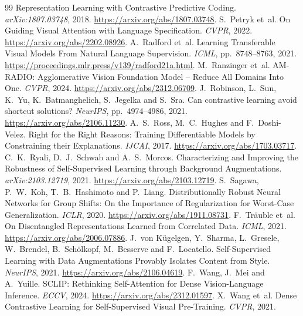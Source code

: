 \documentclass{article}
\begin{document}
\begin{thebibliography}{99}
Representation Learning with Contrastive Predictive Coding. \emph{arXiv:1807.03748}, 2018.
\url{https://arxiv.org/abs/1807.03748}.
S.~Petryk et~al.
On Guiding Visual Attention with Language Specification. \emph{CVPR}, 2022.
\url{https://arxiv.org/abs/2202.08926}.
A.~Radford et~al.
Learning Transferable Visual Models From Natural Language Supervision.
\emph{ICML}, pp.~8748--8763, 2021.
\url{https://proceedings.mlr.press/v139/radford21a.html}.
M.~Ranzinger et~al.
AM-RADIO: Agglomerative Vision Foundation Model -- Reduce All Domains Into One.
\emph{CVPR}, 2024. \url{https://arxiv.org/abs/2312.06709}.
J.~Robinson, L.~Sun, K.~Yu, K.~Batmanghelich, S.~Jegelka and S.~Sra.
Can contrastive learning avoid shortcut solutions? \emph{NeurIPS}, pp.~4974--4986, 2021.
\url{https://arxiv.org/abs/2106.11230}.
A.~S.~Ross, M.~C.~Hughes and F.~Doshi-Velez.
Right for the Right Reasons: Training Differentiable Models by Constraining their Explanations.
\emph{IJCAI}, 2017. \url{https://arxiv.org/abs/1703.03717}.
C.~K.~Ryali, D.~J.~Schwab and A.~S.~Morcos.
Characterizing and Improving the Robustness of Self-Supervised Learning through Background Augmentations.
\emph{arXiv:2103.12719}, 2021. \url{https://arxiv.org/abs/2103.12719}.
S.~Sagawa, P.~W.~Koh, T.~B.~Hashimoto and P.~Liang.
Distributionally Robust Neural Networks for Group Shifts: On the Importance
of Regularization for Worst-Case Generalization.
\emph{ICLR}, 2020. \url{https://arxiv.org/abs/1911.08731}.
F.~Tr\"auble et~al.
On Disentangled Representations Learned from Correlated Data.
\emph{ICML}, 2021. \url{https://arxiv.org/abs/2006.07886}.
J.~von K\"ugelgen, Y.~Sharma, L.~Gresele, W.~Brendel, B.~Sch\"olkopf, M.~Besserve and F.~Locatello.
Self-Supervised Learning with Data Augmentations Provably Isolates Content from Style.
\emph{NeurIPS}, 2021. \url{https://arxiv.org/abs/2106.04619}.
F.~Wang, J.~Mei and A.~Yuille.
SCLIP: Rethinking Self-Attention for Dense Vision-Language Inference. \emph{ECCV}, 2024.
\url{https://arxiv.org/abs/2312.01597}.
X.~Wang et~al.
Dense Contrastive Learning for Self-Supervised Visual Pre-Training. \emph{CVPR}, 2021.

\end{thebibliography}
\end{document}
